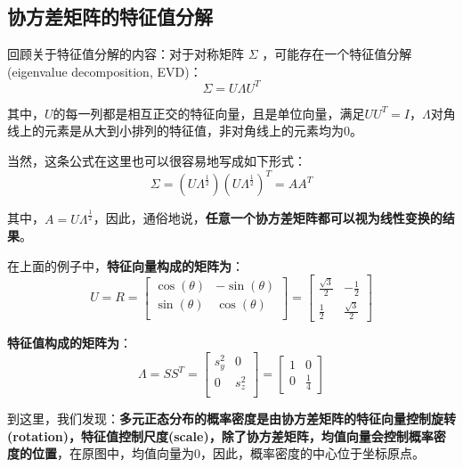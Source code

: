 \documentclass[12pt]{article}
\begin{document}
\subsection{协方差矩阵的特征值分解}
\begin{mdframed}[
linecolor=black!40,outerlinewidth=1pt,roundcorner=.5em,innertopmargin=1ex,innerbottommargin=.5\baselineskip,innerrightmargin=1em,innerleftmargin=1em,backgroundcolor=gray!5,
]
回顾关于特征值分解的内容：对于对称矩阵 $\Sigma$ ，可能存在一个特征值分解(eigenvalue decomposition, EVD)：
$$
\Sigma = U\Lambda U^T
$$

其中，$U$的每一列都是相互正交的特征向量，且是单位向量，满足$UU^T = I$，$\Lambda$对角线上的元素是从大到小排列的特征值，非对角线上的元素均为0。
\end{mdframed}

当然，这条公式在这里也可以很容易地写成如下形式：
$$
\Sigma = (U\Lambda^{\frac{1}{2}})(U\Lambda^{\frac{1}{2}})^T = AA^T
$$

其中，$A = U\Lambda^{\frac{1}{2}}$，因此，通俗地说，\textbf{任意一个协方差矩阵都可以视为线性变换的结果}。

在上面的例子中，\textbf{特征向量构成的矩阵为}：
$$
U = R = \begin{bmatrix}
\cos(\theta) & -\sin(\theta) \\
\sin(\theta) & \cos(\theta) \\
\end{bmatrix} = \begin{bmatrix}
\frac{\sqrt{3}}{2} & -\frac{1}{2} \\
\frac{1}{2} & \frac{\sqrt{3}}{2}
\end{bmatrix}
$$

\textbf{特征值构成的矩阵为}：
$$
\Lambda = SS^T = \begin{bmatrix}
s_y^2 & 0 \\
0 & s_z^2\\
\end{bmatrix} = \begin{bmatrix}
1 & 0 \\ 0 & \frac{1}{4}
\end{bmatrix}
$$

到这里，我们发现：\textbf{多元正态分布的概率密度是由协方差矩阵的特征向量控制旋转(rotation)，特征值控制尺度(scale)，除了协方差矩阵，均值向量会控制概率密度的位置}，在原图中，均值向量为$0$，因此，概率密度的中心位于坐标原点。



\end{document}
